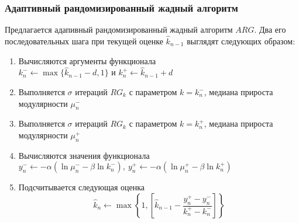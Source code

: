 \begin{frame}
	\frametitle{Адаптивный рандомизированный жадный алгоритм}

	Предлагается адапивный рандомизированный жадный алгоритм $ARG$. Два его последовательных шага при текущей оценке $\hat{k}_{n - 1}$ выглядят следующих образом:
	\begin{enumerate}
		\item Вычисляются аргументы функционала\\
		$k_{n}^{-} \leftarrow \max\{\hat{k}_{n - 1} - d, 1\}$ и $k_{n}^{+} \leftarrow \hat{k}_{n - 1} + d$
		\item Выполняется $\sigma$ итераций $RG_k$ с параметром $k = k_{n}^{-}$, медиана прироста модулярности $\mu_n^{-}$
		\item Выполняется $\sigma$ итераций $RG_k$ с параметром $k = k_{n}^{+}$, медиана прироста модулярности $\mu_n^{+}$
		\item Вычисляются значения функционала\\
		$y_n^{-} \leftarrow -\alpha (\ln \mu_n^{-} - \beta \ln k_n^{-}),\ y_n^{+} \leftarrow -\alpha (\ln \mu_n^{+} - \beta \ln k_n^{+})$
		\item Подсчитывается следующая оценка
		$$\hat{k}_n \leftarrow \max\left\{1, \left[\hat{k}_{n - 1} - \frac{y_n^{+} - y_n^{-}}{k_n^{+} - k_n^{-}}\right]\right\}$$
	\end{enumerate}
\end{frame}


